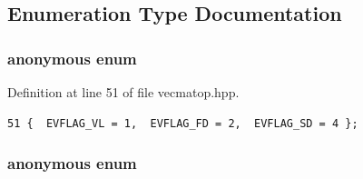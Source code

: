 

\subsection{Enumeration Type Documentation}
\subsubsection{\setlength{\rightskip}{0pt plus 5cm}anonymous enum}\label{vecmatop_8hpp_dca29a1140aadadfd92b34a02fa516ef_dca29a1140aadadfd92b34a02fa516ef}


\begin{Desc}
\item[Enumerator: ]\par
\begin{description}
\item[{\em 
EVFLAG\_\-VL\label{vecmatop_8hpp_dca29a1140aadadfd92b34a02fa516ef_dca29a1140aadadfd92b34a02fa516ef8771bdfa1f2367105af9a7eeaf9efb3c}
}]\item[{\em 
EVFLAG\_\-FD\label{vecmatop_8hpp_dca29a1140aadadfd92b34a02fa516ef_dca29a1140aadadfd92b34a02fa516efacb808ed11f20304d1ee29bc77d807fb}
}]\item[{\em 
EVFLAG\_\-SD\label{vecmatop_8hpp_dca29a1140aadadfd92b34a02fa516ef_dca29a1140aadadfd92b34a02fa516ef037aa5285a9d7eabc5e9902e5bba2b1d}
}]\end{description}
\end{Desc}



Definition at line 51 of file vecmatop.hpp.

\footnotesize\begin{verbatim}51 {  EVFLAG_VL = 1,  EVFLAG_FD = 2,  EVFLAG_SD = 4 };
\end{verbatim}\normalsize 


\subsubsection{\setlength{\rightskip}{0pt plus 5cm}anonymous enum}\label{vecmatop_8hpp_68986ab776eb5d6b5a809a1c005a7300_68986ab776eb5d6b5a809a1c005a7300}


